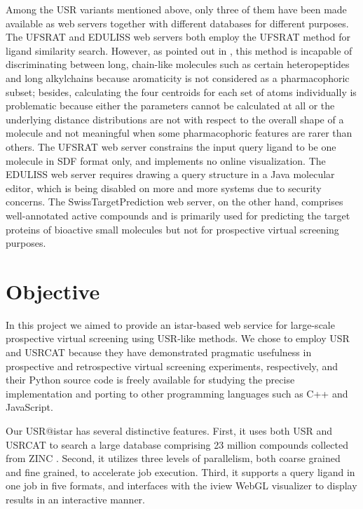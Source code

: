 Among the USR variants mentioned above, only three of them \citep{1436,1437,1408} have been made available as web servers together with different databases for different purposes. The UFSRAT \citep{1436} and EDULISS \citep{1437} web servers both employ the UFSRAT \citep{1436} method for ligand similarity search. However, as pointed out in \citep{1331}, this method is incapable of discriminating between long, chain-like molecules such as certain heteropeptides and long alkylchains because aromaticity is not considered as a pharmacophoric subset; besides, calculating the four centroids for each set of atoms individually is problematic because either the parameters cannot be calculated at all or the underlying distance distributions are not with respect to the overall shape of a molecule and not meaningful when some pharmacophoric features are rarer than others. The UFSRAT \citep{1436} web server constrains the input query ligand to be one molecule in SDF format only, and implements no online visualization. The EDULISS \citep{1437} web server requires drawing a query structure in a Java molecular editor, which is being disabled on more and more systems due to security concerns. The SwissTargetPrediction \citep{1408} web server, on the other hand, comprises well-annotated active compounds and is primarily used for predicting the target proteins of bioactive small molecules but not for prospective virtual screening purposes.

\section{Objective}

In this project we aimed to provide an istar-based \citep{1362} web service for large-scale prospective virtual screening using USR-like methods. We chose to employ USR \citep{1379} and USRCAT \citep{1331} because they have demonstrated pragmatic usefulness in prospective \citep{1380,1281,1504,1502,1615} and retrospective \citep{1331} virtual screening experiments, respectively, and their Python source code is freely available for studying the precise implementation and porting to other programming languages such as C++ and JavaScript.

Our USR@istar has several distinctive features. First, it uses both USR and USRCAT to search a large database comprising 23 million compounds collected from ZINC \citep{532,1178}. Second, it utilizes three levels of parallelism, both coarse grained and fine grained, to accelerate job execution. Third, it supports a query ligand in one job in five formats, and interfaces with the iview \citep{1366} WebGL visualizer to display results in an interactive manner.

